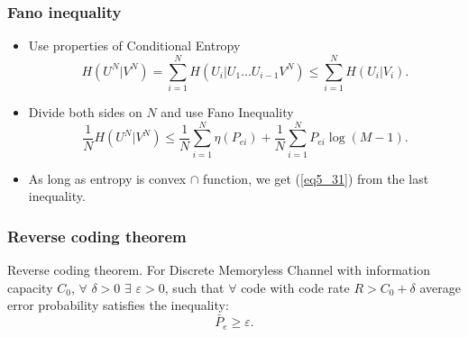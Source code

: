\documentclass[14pt]{beamer}
\begin{document}
\begin{frame}
\frametitle{Fano inequality}
\begin{itemize}

    
    \item Use properties of Conditional Entropy
    \footnotesize {
    \[
    H(U^N\vert V^N) = \sum\limits_{i = 1}^N {H(U_i \vert U_1 ...U_{i - 1} V^N)
    \le } \sum\limits_{i = 1}^N {H(U_i \vert V_i )} .
    \]
    }

    \item \normalsize Divide both sides on $N$ and use Fano Inequality
    \footnotesize {
    \[
    \frac{1}{N}H(U^N\vert V^N) \le \frac{1}{N}\sum\limits_{i = 1}^N
    {\eta(P_{ei} ) + } \frac{1}{N}\sum\limits_{i = 1}^N {P_{ei} \log (M
    - 1)} .
    \]
    }
    
    \item \normalsize As long as entropy is convex $ \cap $ function, we get (\ref{eq5_31}) from the last inequality. \QED



\end{itemize}
\end{frame}




\begin{frame}
\frametitle{Reverse coding theorem}
\begin{itemize}

    \begin{theorem} {Reverse coding theorem.} For Discrete Memoryless Channel with information capacity $C_0 $, $\forall$ $\delta > 0$ $\exists$ $\varepsilon > 0$, such that $\forall$ code with code rate $R > C_0 + \delta $ average error probability satisfies the inequality:
    \[
    \bar {P}_e \ge \varepsilon .
    \]
    \end{theorem}


\end{itemize}
\end{frame}
\end{document}
